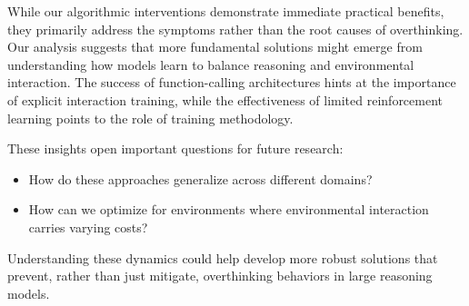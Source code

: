 While our algorithmic interventions demonstrate immediate practical benefits, they primarily address the symptoms rather than the root causes of overthinking. Our analysis suggests that more fundamental solutions might emerge from understanding how models learn to balance reasoning and environmental interaction. The success of function-calling architectures hints at the importance of explicit interaction training, while the effectiveness of limited reinforcement learning points to the role of training methodology.

These insights open important questions for future research:
\begin{itemize}
    \item How do these approaches generalize across different domains?
    \item How can we optimize for environments where environmental interaction carries varying costs?
\end{itemize}

Understanding these dynamics could help develop more robust solutions that prevent, rather than just mitigate, overthinking behaviors in large reasoning models.